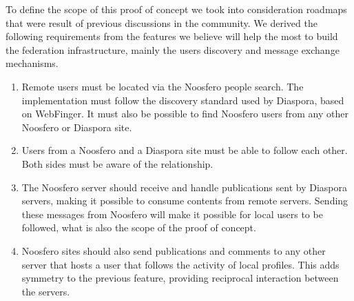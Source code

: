 To define the scope of this proof of concept we took into consideration
roadmaps that were result of previous discussions in the community. We derived
the following requirements from the features we believe will help the most to
build the federation infrastructure, mainly the users discovery and message
exchange mechanisms.

\begin{enumerate}
  \item
    Remote users must be located via the Noosfero people search. The
    implementation must follow the discovery standard used by
    Diaspora, based on WebFinger. It must also be possible to find
    Noosfero users from any other Noosfero or Diaspora site.

  \item
    Users from a Noosfero and a Diaspora site must be able to follow
    each other. Both sides must be aware of the relationship.

  \item
    The Noosfero server should receive and handle publications sent by
    Diaspora servers, making it possible to consume contents from remote
    servers. Sending these messages from Noosfero will make it possible
    for local users to be followed, what is also the scope of the proof
    of concept.

  \item
    Noosfero sites should also send publications and comments to any
    other server that hosts a user that follows the activity of local profiles.
    This adds symmetry to the previous feature, providing reciprocal interaction
    between the servers.
\end{enumerate}
